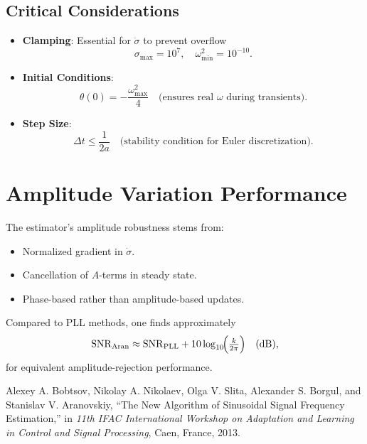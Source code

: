 \documentclass{article}
\begin{document}
\subsection{Critical Considerations}
\begin{itemize}
  \item \textbf{Clamping}: Essential for \(\dot{\sigma}\) to prevent overflow  
  \[
    \sigma_{\max} = 10^7,\quad \omega_{\min}^2 = 10^{-10}.
  \]
  \item \textbf{Initial Conditions}:
  \[
    \theta(0) = -\frac{\omega_{\max}^2}{4}
    \quad\text{(ensures real \(\omega\) during transients)}.
  \]
  \item \textbf{Step Size}:
  \[
    \Delta t \le \frac{1}{2a}
    \quad\text{(stability condition for Euler discretization)}.
  \]
\end{itemize}

\section{Amplitude Variation Performance}

The estimator’s amplitude robustness stems from:
\begin{itemize}
  \item Normalized gradient in \(\dot{\sigma}\).
  \item Cancellation of \(A\)-terms in steady state.
  \item Phase-based rather than amplitude-based updates.
\end{itemize}

Compared to PLL methods, one finds approximately
\[
\mathrm{SNR}_{\text{Aran}} 
\approx \mathrm{SNR}_{\text{PLL}} 
+ 10\log_{10}\!\Bigl(\tfrac{k}{2\pi}\Bigr)
\quad\text{(dB)},
\]
for equivalent amplitude-rejection performance.

\begin{thebibliography}{9}
Alexey A. Bobtsov, Nikolay A. Nikolaev, Olga V. Slita, Alexander S. Borgul, and Stanislav V. Aranovskiy, 
``The New Algorithm of Sinusoidal Signal Frequency Estimation,'' 
in \emph{11th IFAC International Workshop on Adaptation and Learning in Control and Signal Processing}, 
Caen, France, 2013.
\end{thebibliography}
\end{document}
